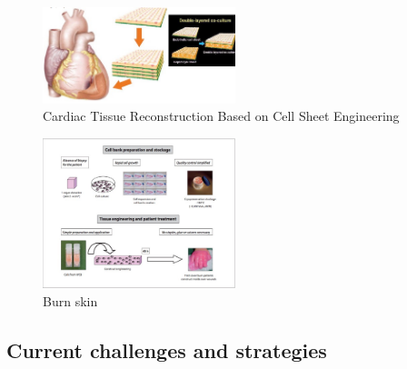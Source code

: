 \begin{figure}[H]
        \centering
        \includegraphics[width=0.5\textwidth]{cardiac_sheet.png}
        \caption{\label{fig:cardiac_sheet} Cardiac Tissue Reconstruction Based on Cell Sheet Engineering}
\end{figure}

\begin{figure}[H]
        \centering
        \includegraphics[width=0.5\textwidth]{cell_bank.png}
        \caption{\label{fig:cell_bank} Burn skin}
\end{figure}

    \subsection{Current challenges and strategies}

